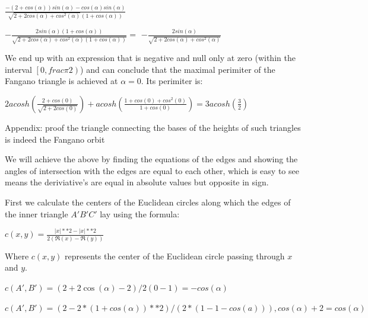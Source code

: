\documentclass[a4paper,10pt]{article}
\begin{document}
$  \frac{-\left(2 + cos\left(\alpha\right)\right) sin\left(\alpha\right) - cos\left(\alpha\right) sin\left(\alpha\right)}{\sqrt{2 + 2 cos\left(\alpha\right) + cos^{2}\left(\alpha\right)} \left(1 + cos\left(\alpha\right)\right)} $

$- \frac{2sin\left(\alpha\right)\left(1 + cos\left(\alpha\right)\right)}{\sqrt{2 + 2 cos\left(\alpha\right) + cos^{2}\left(\alpha\right)\left(1 + cos\left(\alpha\right)\right)}} =$
$- \frac{2sin\left(\alpha\right)}{\sqrt{2 + 2 cos\left(\alpha\right) + cos^{2}\left(\alpha\right)}}$

\noindent
We end up with an expression that is negative and null only at zero (within the
interval $\left[0,frac{\pi}{2}\right)$) and can conclude that the maximal perimiter
of the Fangano triangle is achieved at $\alpha = 0$. Its perimiter is:

\begin{center}
$2acosh\left(\frac{2 + cos\left(0\right)}{\sqrt{2 + 2 cos\left(0\right)}}\right) + 
acosh\left(\frac{1 + cos\left(0\right) + cos^{2}\left(0\right)}{1 + cos\left(0\right)}\right) =
3acosh\left(\frac{3}{2}\right)$
\end{center}


Appendix: proof the triangle connecting the bases of the heights of such triangles 
is indeed the Fangano orbit

We will achieve the above by finding the equations of the edges and showing the
angles of intersection with the edges are equal to each other, which is easy to
see means the deriviative's are equal in absolute values but opposite in sign.


First we calculate the centers of the Euclidean circles along which the edges
of the inner triangle $A'B'C'$ lay using the formula:

\begin{center}
  $c\left(x,y\right) = \frac{\left|x\right|**2 - \left|x\right|**2}{2\left(\Re(x) - \Re(y)\right)} $
\end{center}

Where $c\left(x,y\right)$ represents the center of the Euclidean circle passing
through $x$ and $y$.

  $c\left(A',B'\right) = \left(2 + 2\cos\left(\alpha\right) - 2\right) / {2\left(0 - 1\right)} = -cos(\alpha) $

  $c\left(A',B'\right) = \left(2 - 2*\left(1+ cos\left(\alpha\right)\right)**2\right) / \left(2*\left(1 - 1 -  cos\left(a\right)\right)\right), 
    cos\left(\alpha\right) + 2 = cos\left(\alpha\right)$
\end{document}
